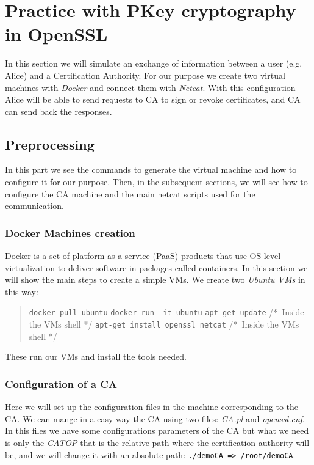 \documentclass[11pt]{article}
\begin{document}
\section{Practice with PKey cryptography in OpenSSL}
In this section we will simulate an exchange of information between a user (e.g. Alice) and a Certification Authority. For our purpose we create two virtual machines with {\em Docker} and connect them with {\em Netcat}. With this configuration Alice will be able to send requests to CA to sign or revoke certificates, and CA can send back the responses.

\subsection{Preprocessing}
In this part we see the commands to generate the virtual machine and how to configure it for our purpose. Then, in the subsequent sections, we will see how to configure the CA machine and the main netcat scripts used for the communication.

\subsubsection{Docker Machines creation}
Docker is a set of platform as a service (PaaS) products that use OS-level virtualization to deliver software in packages called containers. In this section we will show the main steps to create a simple VMs. We create two {\em Ubuntu VMs} in this way:

\begin{quote}
  \texttt{docker pull ubuntu}\newline
  \texttt{docker run -it ubuntu}\newline
  \texttt{apt-get update}                     \quad\quad\quad\quad\quad\quad /* Inside the VMs shell */ \newline
  \texttt{apt-get install openssl netcat}     /* Inside the VMs shell */
\end{quote}

These run our VMs and install the tools needed.

\subsubsection{Configuration of a CA}
Here we will set up the configuration files in the machine corresponding to the CA. We can mange in a easy way the CA using two files: {\em CA.pl} and {\em openssl.cnf}. In this files we have some configurations parameters of the CA but what we need is only the {\em CATOP} that is the relative path where the certification authority will be, and we will change it with an absolute path: \texttt{./demoCA => /root/demoCA}.
\end{document}
